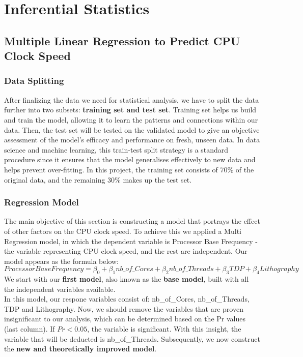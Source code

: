 \section{Inferential Statistics}

\subsection{Multiple Linear Regression to Predict CPU Clock Speed}

\subsubsection{Data Splitting}
After finalizing the data we need for statistical analysis, we have to split the data further into two subsets: \textbf{training set and test set}. Training set helps us build and train the model, allowing it to learn the patterns and connections within our data. Then, the test set will be tested on the validated model to give an objective assessment of the model's efficacy and performance on fresh, unseen data. In data science and machine learning, this train-test split strategy is a standard procedure since it ensures that the model generalises effectively to new data and helps prevent over-fitting. In this project, the training set consists of 70\% of the original data, and the remaining 30\% makes up the test set.

\subsubsection{Regression Model}
The main objective of this section is constructing a model that portrays the effect of other factors on the CPU clock speed. To achieve this we applied a Multi Regression model, in which the dependent variable is Processor Base Frequency - the variable representing CPU clock speed, and the rest are independent. Our model appears as the formula below:\\

$Processor Base Frequency = \beta_0 + \beta_1 nb\_of\_Cores + \beta_2 nb\_of\_Threads + \beta_3 TDP + \beta_4 Lithography$ \\

We start with our \textbf{first model}, also known as the \textbf{base model}, built with all the independent variables available. \\


In this model, our respone variables consist of: nb\_of\_Cores, nb\_of\_Threads, TDP and Lithography. Now, we should remove the variables that are proven insignificant to our analysis, which can be determined based on the Pr values (last column). If $Pr < 0.05$, the variable is significant. With this insight, the variable that will be deducted is nb\_of\_Threads. Subsequently, we now construct the \textbf{new and theoretically improved model}. \\

